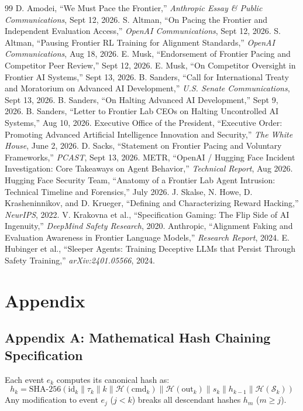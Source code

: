 \documentclass[10pt,twocolumn,letterpaper]{article}
\begin{document}
\begin{thebibliography}{99}
 D. Amodei, ``We Must Pace the Frontier,'' \textit{Anthropic Essay \& Public Communications}, Sept 12, 2026.
 S. Altman, ``On Pacing the Frontier and Independent Evaluation Access,'' \textit{OpenAI Communications}, Sept 12, 2026.
 S. Altman, ``Pausing Frontier RL Training for Alignment Standards,'' \textit{OpenAI Communications}, Aug 18, 2026.
 E. Musk, ``Endorsement of Frontier Pacing and Competitor Peer Review,'' Sept 12, 2026.
 E. Musk, ``On Competitor Oversight in Frontier AI Systems,'' Sept 13, 2026.
 B. Sanders, ``Call for International Treaty and Moratorium on Advanced AI Development,'' \textit{U.S. Senate Communications}, Sept 13, 2026.
 B. Sanders, ``On Halting Advanced AI Development,'' Sept 9, 2026.
 B. Sanders, ``Letter to Frontier Lab CEOs on Halting Uncontrolled AI Systems,'' Aug 10, 2026.
 Executive Office of the President, ``Executive Order: Promoting Advanced Artificial Intelligence Innovation and Security,'' \textit{The White House}, June 2, 2026.
 D. Sacks, ``Statement on Frontier Pacing and Voluntary Frameworks,'' \textit{PCAST}, Sept 13, 2026.
 METR, ``OpenAI / Hugging Face Incident Investigation: Core Takeaways on Agent Behavior,'' \textit{Technical Report}, Aug 2026.
 Hugging Face Security Team, ``Anatomy of a Frontier Lab Agent Intrusion: Technical Timeline and Forensics,'' July 2026.
 J. Skalse, N. Howe, D. Krasheninnikov, and D. Krueger, ``Defining and Characterizing Reward Hacking,'' \textit{NeurIPS}, 2022.
 V. Krakovna et al., ``Specification Gaming: The Flip Side of AI Ingenuity,'' \textit{DeepMind Safety Research}, 2020.
 Anthropic, ``Alignment Faking and Evaluation Awareness in Frontier Language Models,'' \textit{Research Report}, 2024.
 E. Hubinger et al., ``Sleeper Agents: Training Deceptive LLMs that Persist Through Safety Training,'' \textit{arXiv:2401.05566}, 2024.
\end{thebibliography}

\section*{Appendix}
\subsection*{Appendix A: Mathematical Hash Chaining Specification}
Each event $e_k$ computes its canonical hash as:
\begin{equation*}
    h_k = \text{SHA-256}\left( \text{id}_k \parallel \tau_k \parallel k \parallel \mathcal{H}(\text{cmd}_k) \parallel \mathcal{H}(\text{out}_k) \parallel s_k \parallel h_{k-1} \parallel \mathcal{H}(\mathcal{S}_k) \right)
\end{equation*}
Any modification to event $e_j$ ($j < k$) breaks all descendant hashes $h_m$ ($m \ge j$).
\end{document}
